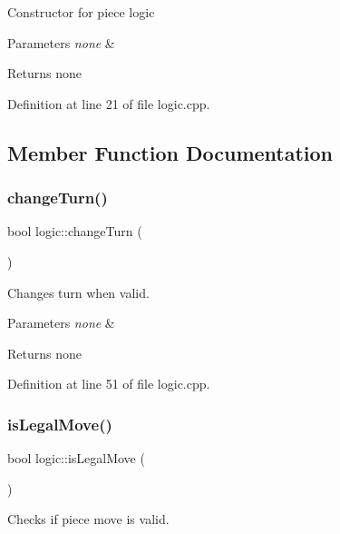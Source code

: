 Constructor for piece logic


\begin{DoxyParams}{Parameters}
{\em none} & \\
\hline
\end{DoxyParams}
\begin{DoxyReturn}{Returns}
none 
\end{DoxyReturn}


Definition at line 21 of file logic.\+cpp.



\subsection{Member Function Documentation}
\mbox{\label{classlogic_ae9ff5d7c6cbe86bf69e338e9bb7c0d6c}} 
\subsubsection{\texorpdfstring{changeTurn()}{changeTurn()}}
{\footnotesize\ttfamily bool logic\+::change\+Turn (\begin{DoxyParamCaption}{ }\end{DoxyParamCaption})}

Changes turn when valid.


\begin{DoxyParams}{Parameters}
{\em none} & \\
\hline
\end{DoxyParams}
\begin{DoxyReturn}{Returns}
none 
\end{DoxyReturn}


Definition at line 51 of file logic.\+cpp.

\mbox{\label{classlogic_af7266d036a6df1328c85b8ea6bfb0fab}} 
\subsubsection{\texorpdfstring{isLegalMove()}{isLegalMove()}}
{\footnotesize\ttfamily bool logic\+::is\+Legal\+Move (\begin{DoxyParamCaption}{ }\end{DoxyParamCaption})}

Checks if piece move is valid.



